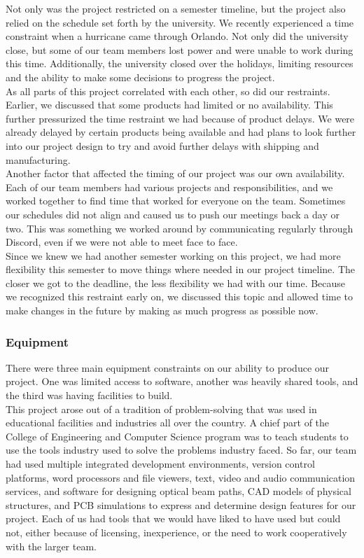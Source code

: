 Not only was the project restricted on a semester timeline, but the project also relied on the schedule set forth by the university. We recently experienced a time constraint when a hurricane came through Orlando. Not only did the university close, but some of our team members lost power and were unable to work during this time. Additionally, the university closed over the holidays, limiting resources and the ability to make some decisions to progress the project.\\

As all parts of this project correlated with each other, so did our restraints. Earlier, we discussed that some products had limited or no availability. This further pressurized the time restraint we had because of product delays. We were already delayed by certain products being available and had plans to look further into our project design to try and avoid further delays with shipping and manufacturing.\\

Another factor that affected the timing of our project was our own availability. Each of our team members had various projects and responsibilities, and we worked together to find time that worked for everyone on the team. Sometimes our schedules did not align and caused us to push our meetings back a day or two. This was something we worked around by communicating regularly through Discord, even if we were not able to meet face to face.\\

Since we knew we had another semester working on this project, we had more flexibility this semester to move things where needed in our project timeline. The closer we got to the deadline, the less flexibility we had with our time. Because we recognized this restraint early on, we discussed this topic and allowed time to make changes in the future by making as much progress as possible now.\\
\subsubsection{Equipment}
There were three main equipment constraints on our ability to produce our project. One was limited access to software, another was heavily shared tools, and the third was having facilities to build.\\

This project arose out of a tradition of problem-solving that was used in educational facilities and industries all over the country. A chief part of the College of Engineering and Computer Science program was to teach students to use the tools industry used to solve the problems industry faced. So far, our team had used multiple integrated development environments, version control platforms, word processors and file viewers, text, video and audio communication services, and software for designing optical beam paths, CAD models of physical structures, and PCB simulations to express and determine design features for our project. Each of us had tools that we would have liked to have used but could not, either because of licensing, inexperience, or the need to work cooperatively with the larger team.\\


